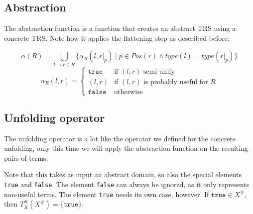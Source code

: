 \subsection{Abstraction}
The abstraction function is a function that creates an abstract TRS using a concrete TRS. Note how it applies the flattening step as described before: \begin{definition}
\label{def:abstraction}
\[
\alpha(R) = \bigcup\limits_{l \rightarrow r \in R} \{\alpha_R(l, \left.r\right|_p) \mid p \in \textit{Pos}(r) \land \textit{type}(l) = \textit{type}(\left.r\right|_p)\} 
\]
\[
\alpha_R(l, r) =
\left\{
    \begin{array}{ll}
        \texttt{true} & \text{if } (l, r) \text{ semi-unify}\\
        (l, r) & \text{if } (l, r) \text{ is probably useful for } R\\
        \texttt{false} & \text{otherwise}
    \end{array}
\right.
\]
\end{definition}

\subsection{Unfolding operator}
The unfolding operator is a lot like the operator we defined for the concrete unfolding, only this time we will apply the abstraction function on the resulting pairs of terms:

\begin{definition}
\label{def:abstunf}
\end{definition}
\begin{center}
\end{center}

Note that this takes as input an abstract domain, so also the special elements \texttt{true} and \texttt{false}. The element \texttt{false} can always be ignored, as it only represents non-useful terms. The element \texttt{true} needs its own case, however. If $\texttt{true} \in X^{\#}$, then $T_R^{\#}(X^{\#}) = \{ \texttt{true} \}$. 

